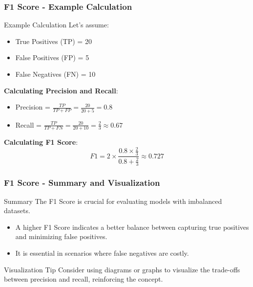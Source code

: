 \documentclass[aspectratio=169]{beamer}
\begin{document}
\begin{frame}[fragile]
    \frametitle{F1 Score - Example Calculation}
    \begin{block}{Example Calculation}
        Let's assume:
        \begin{itemize}
            \item True Positives (TP) = 20
            \item False Positives (FP) = 5
            \item False Negatives (FN) = 10
        \end{itemize}
        
        \textbf{Calculating Precision and Recall}:
        \begin{itemize}
            \item Precision = \( \frac{TP}{TP + FP} = \frac{20}{20 + 5} = 0.8 \)
            \item Recall = \( \frac{TP}{TP + FN} = \frac{20}{20 + 10} = \frac{2}{3} \approx 0.67 \)
        \end{itemize}
        
        \textbf{Calculating F1 Score}:
        \begin{equation}
            F1 = 2 \times \frac{0.8 \times \frac{2}{3}}{0.8 + \frac{2}{3}} \approx 0.727
        \end{equation}
    \end{block}
\end{frame}

\begin{frame}[fragile]
    \frametitle{F1 Score - Summary and Visualization}
    \begin{block}{Summary}
        The F1 Score is crucial for evaluating models with imbalanced datasets.
        \begin{itemize}
            \item A higher F1 Score indicates a better balance between capturing true positives and minimizing false positives.
            \item It is essential in scenarios where false negatives are costly.
        \end{itemize}
    \end{block}

    \begin{block}{Visualization Tip}
        Consider using diagrams or graphs to visualize the trade-offs between precision and recall, reinforcing the concept.
    \end{block}
\end{frame}
\end{document}
